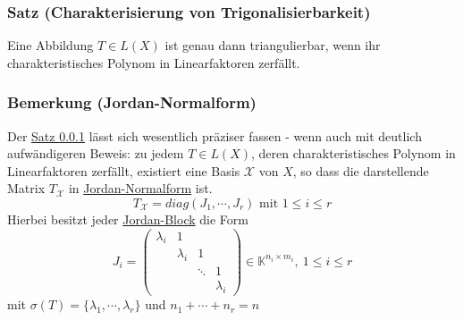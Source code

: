 \subsubsection{Satz (Charakterisierung von Trigonalisierbarkeit)}
\label{4.4.5}
Eine Abbildung $T\in L(X)$ ist genau dann triangulierbar, wenn ihr charakteristisches Polynom in Linearfaktoren zerfällt.
\subsubsection{Bemerkung (Jordan-Normalform)}
Der \hyperref[4.4.5]{Satz \ref{4.4.5}} lässt sich wesentlich präziser fassen - wenn auch mit deutlich aufwändigeren Beweis: zu jedem $T\in L(X)$, deren charakteristisches Polynom in Linearfaktoren zerfällt, existiert eine Basis $\mathcal{X}$ von $X$, so dass die darstellende Matrix $T_\mathcal{X}$ in \underline{Jordan-Normalform} ist.
\[T_\mathcal{X}=diag(J_1,\cdots ,J_r)\text{ mit } 1\leq i\leq r\]
Hierbei besitzt jeder \underline{Jordan-Block} die Form 
\[J_i=\begin{pmatrix}\lambda _i & 1\\ & \lambda _i & 1 \\& & \ddots & 1\\ & & & \lambda _i\end{pmatrix}\in\mathbb{K}^{n_i\times m_i},\ 1\leq i\leq r\]
mit $\sigma (T) = \{\lambda _1,\cdots ,\lambda _r\}$ und $n_1+\cdots +n_r=n$